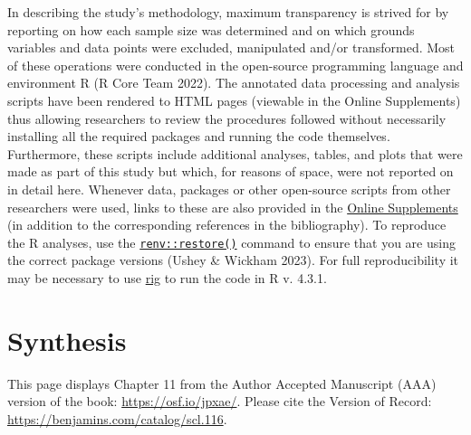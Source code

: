 \documentclass[
  letterpaper,
  DIV=11,
  numbers=noendperiod]{scrreprt}
\begin{document}
In describing the study's methodology, maximum transparency is strived
for by reporting on how each sample size was determined and on which
grounds variables and data points were excluded, manipulated and/or
transformed. Most of these operations were conducted in the open-source
programming language and environment R (R Core Team 2022). The annotated
data processing and analysis scripts have been rendered to HTML pages
(viewable in the Online Supplements) thus allowing researchers to review
the procedures followed without necessarily installing all the required
packages and running the code themselves. Furthermore, these scripts
include additional analyses, tables, and plots that were made as part of
this study but which, for reasons of space, were not reported on in
detail here. Whenever data, packages or other open-source scripts from
other researchers were used, links to these are also provided in the
\href{https://elenlefoll.github.io/TextbookMDA/references.html}{Online
Supplements} (in addition to the corresponding references in the
bibliography). To reproduce the R analyses, use the
\href{https://rstudio.github.io/renv/reference/restore.html}{\texttt{renv::restore()}}
command to ensure that you are using the correct package versions (Ushey
\& Wickham 2023). For full reproducibility it may be necessary to use
\href{https://github.com/r-lib/rig}{rig} to run the code in R v. 4.3.1.


\chapter{Synthesis}\label{synthesis}

\begin{tcolorbox}[enhanced jigsaw, toprule=.15mm, coltitle=black, rightrule=.15mm, colframe=quarto-callout-note-color-frame, titlerule=0mm, bottomrule=.15mm, colbacktitle=quarto-callout-note-color!10!white, colback=white, arc=.35mm, opacitybacktitle=0.6, toptitle=1mm, bottomtitle=1mm, leftrule=.75mm, left=2mm, title=\textcolor{quarto-callout-note-color}{\faInfo}\hspace{0.5em}{Note}, opacityback=0, breakable]

This page displays Chapter 11 from the Author Accepted Manuscript (AAA)
version of the book: \url{https://osf.io/jpxae/}. Please cite the
Version of Record: \url{https://benjamins.com/catalog/scl.116}.

\end{tcolorbox}
\end{document}
